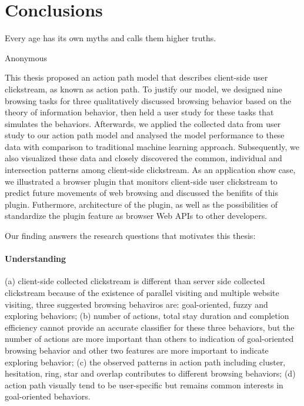 \section{Conclusions}
\label{ch:final}

\epigraph{Every age has its own myths and calls them higher truths.}{Anonymous}



This thesis proposed an action path model that describes client-side user clickstream,
as known as action path.
To justify our model, we designed nine browsing tasks for three qualitatively
discussed browsing behavior based on the theory of information behavior, then 
held a user study for these tasks that simulates the behaviors. 
Afterwards, we applied the collected data from user study to our action path model and
analysed the model performance to these data with comparison to traditional machine 
learning approach.
Subsequently, we also visualized these data and closely discovered the common, 
individual and intersection patterns among client-side clickstream.
As an application show case, we illustrated a browser plugin that monitors client-side 
user clickstream to predict future movements of web browsing and discussed the benifits of this plugin.
Futhermore,
 architecture of the plugin, 
as well as the possibilities of standardize the plugin feature as browser Web APIs to other developers.


Our finding answers the research questions that motivates this thesis:

\paragraph{Understanding} (a) client-side collected clickstream is different than 
server side collected clickstream because of the existence of parallel visiting 
and multiple website visiting, three suggested browsing behaviros are: 
goal-oriented, fuzzy and exploring behaviors;
(b) number of actions, total stay duration and completion efficiency cannot 
provide an accurate classifier for these three behaviors, 
but the number of actions are more important than others to indication of 
goal-oriented browsing behavior and other two features are more important 
to indicate exploring behavior;
(c) the observed patterns in action path including cluster, hesitation, ring, 
star and overlap contributes to different browsing behaviors;
(d) action path visually tend to be user-specific but remains common interests 
in goal-oriented behaviors.
